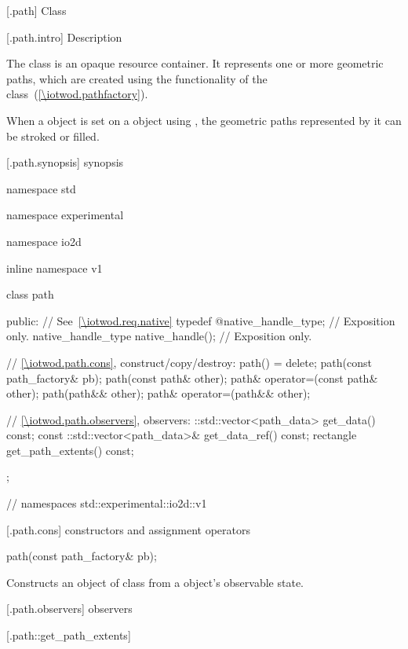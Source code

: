  [\iotwod.path] {Class }

 [\iotwod.path.intro] { Description}

\pnum
{}%
The  class is an opaque resource container. It represents one or 
more geometric paths, which are created using the functionality of the 
 class~(\ref{\iotwod.pathfactory}).

\pnum
When a  object is set on a  object using 
, the geometric paths represented by it can be 
stroked or filled.

 [\iotwod.path.synopsis] { synopsis}

\begin{codeblock}
namespace std { namespace experimental { namespace io2d { inline namespace v1 {
  class path {
    public:
    // See~\ref{\iotwod.req.native}
    typedef @\impdef@ native_handle_type; // Exposition only.
    native_handle_type native_handle(); // Exposition only.
  	
    // \ref{\iotwod.path.cons}, construct/copy/destroy:
    path() = delete;
    path(const path_factory& pb);
    path(const path& other);
    path& operator=(const path& other);
    path(path&& other);
    path& operator=(path&& other);
  	
    // \ref{\iotwod.path.observers}, observers:
    ::std::vector<path_data> get_data() const;
    const ::std::vector<path_data>& get_data_ref() const;
    rectangle get_path_extents() const;
  };
} } } } // namespaces std::experimental::io2d::v1
\end{codeblock}

 [\iotwod.path.cons] { constructors and assignment operators}

%
\begin{itemdecl}
	path(const path_factory& pb);
\end{itemdecl}

\begin{itemdescr}
	\pnum
	\effects
	Constructs an object of class  from a  
	object's observable state.
\end{itemdescr}

 [\iotwod.path.observers] { observers}

 [\iotwod.path::get_path_extents] {}

